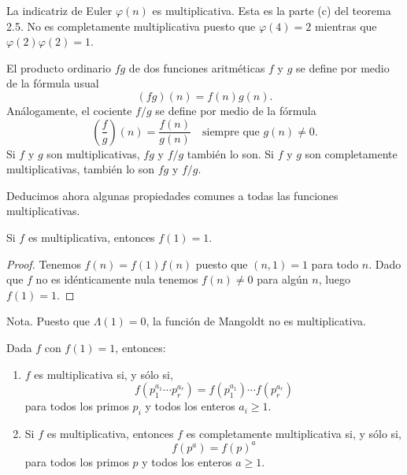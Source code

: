\documentclass[12pt,a4paper]{book}
\begin{document}
    \begin{ejemplo}
        La indicatriz de Euler $\varphi(n)$ es multiplicativa. Esta es la parte (c) del
        teorema 2.5. No es completamente multiplicativa puesto que $\varphi(4)=2$ mientras
        que $\varphi(2)\varphi(2)=1$.
    \end{ejemplo}

    \begin{ejemplo}
        El producto ordinario $fg$ de dos funciones aritméticas $f$ y $g$ se define por
        medio de la fórmula usual
        \begin{equation*}
            (fg)(n)=f(n)g(n).
        \end{equation*}
        Análogamente, el cociente $f/g$ se define por medio de la fórmula
        \begin{equation*}
            \left(\frac{f}{g}\right)(n)=\frac{f(n)}{g(n)}\quad\text{siempre que } g(n)\neq0.
        \end{equation*}
        Si $f$ y $g$ son multiplicativas, $fg$ y $f/g$ también lo son. Si $f$ y $g$ son
        completamente multiplicativas, también lo son $fg$ y $f/g$.
    \end{ejemplo}

    Deducimos ahora algunas propiedades comunes a todas las funciones multiplicativas.

    \begin{teorema}
        Si $f$ es multiplicativa, entonces $f(1)=1$.
    \end{teorema}

    \begin{proof}
        Tenemos $f(n)=f(1)f(n)$ puesto que $(n,1)=1$ para todo $n$. Dado que $f$ no es
        idénticamente nula tenemos $f(n)\neq0$ para algún $n$, luego $f(1)=1$.
    \end{proof}

    Nota. Puesto que $\Lambda(1)=0$, la función de Mangoldt no es multiplicativa.

    \begin{teorema}
        Dada $f$ con $f(1)=1$, entonces:
        \begin{enumerate}
            \item[(a)] $f$ es multiplicativa si, y sólo si,
            \begin{equation*}
                f(p_1^{a_1}\cdots p_r^{a_r})=f(p_1^{a_1})\cdots f(p_r^{a_r})
            \end{equation*}
            para todos los primos $p_i$ y todos los enteros $a_i\geq1$.
            \item[(b)] Si $f$ es multiplicativa, entonces $f$ es completamente
            multiplicativa si, y sólo si,
            \begin{equation*}
                f(p^a)=f(p)^a
            \end{equation*}
            para todos los primos $p$ y todos los enteros $a\geq1$.
        \end{enumerate}
    \end{teorema}
\end{document}
